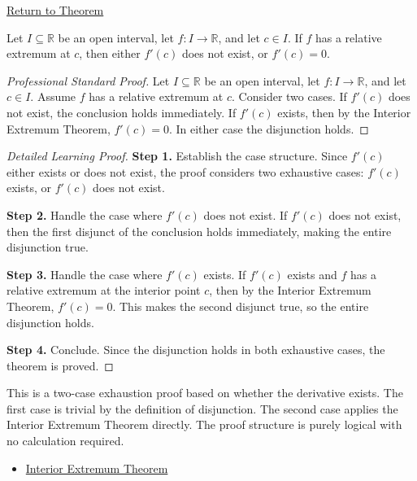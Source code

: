 \newpage
{}
\label{prf:relative-extremum-derivatives-equal-0-or-dont-exist}

\begin{remark*}[Return]
\hyperref[cor:necessary-condition-extremum]{Return to Theorem}
\end{remark*}

\begin{corollary*}
Let $I \subseteq \mathbb{R}$ be an open interval, let $f : I \to \mathbb{R}$, and let $c \in I$. If $f$ has a relative extremum at $c$, then either $f'(c)$ does not exist, or $f'(c) = 0$.
\end{corollary*}

\begin{proof}[Professional Standard Proof]
\LRAProofBodyStart
Let $I \subseteq \mathbb{R}$ be an open interval, let $f : I \to \mathbb{R}$, and let $c \in I$. Assume $f$ has a relative extremum at $c$. Consider two cases. If $f'(c)$ does not exist, the conclusion holds immediately. If $f'(c)$ exists, then by the Interior Extremum Theorem, $f'(c) = 0$. In either case the disjunction holds.
\end{proof}

\begin{proof}[Detailed Learning Proof]
\LRAProofBodyStart

\textbf{Step 1.} Establish the case structure. Since $f'(c)$ either exists or does not exist, the proof considers two exhaustive cases: $f'(c)$ exists, or $f'(c)$ does not exist.

\textbf{Step 2.} Handle the case where $f'(c)$ does not exist. If $f'(c)$ does not exist, then the first disjunct of the conclusion holds immediately, making the entire disjunction true.

\textbf{Step 3.} Handle the case where $f'(c)$ exists. If $f'(c)$ exists and $f$ has a relative extremum at the interior point $c$, then by the Interior Extremum Theorem, $f'(c) = 0$. This makes the second disjunct true, so the entire disjunction holds.

\textbf{Step 4.} Conclude. Since the disjunction holds in both exhaustive cases, the theorem is proved.
\end{proof}

\begin{remark*}
This is a two-case exhaustion proof based on whether the derivative exists. The first case is trivial by the definition of disjunction. The second case applies the Interior Extremum Theorem directly. The proof structure is purely logical with no calculation required.
\end{remark*}

\begin{dependencies}
\begin{itemize}
  \item \hyperref[thm:interior-extremum-theorem]{Interior Extremum Theorem}
\end{itemize}
\end{dependencies}

\clearpage
